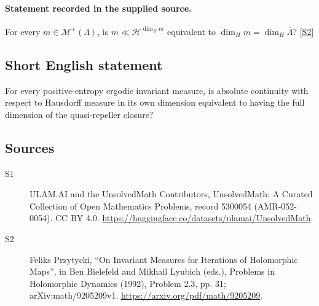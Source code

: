 \documentclass[11pt]{article}
\newcommand{\sref}[2]{\hyperlink{source:#1:#2}{[S#2]}}
\begin{document}
\paragraph{Statement recorded in the supplied source.}
For every $m\in\mathcal M^+(\Lambda)$, is $m\ll\mathcal H^{\dim_Hm}$ equivalent to $\dim_Hm=\dim_H\overline\Lambda$? \sref{5300054}{2}
\subsection{Short English statement}
For every positive-entropy ergodic invariant measure, is absolute continuity with respect to Hausdorff measure in its own dimension equivalent to having the full dimension of the quasi-repeller closure?
\subsection{Sources}
\begin{description}
\item[\hypertarget{source:5300054:1}{S1}] ULAM.AI and the UnsolvedMath Contributors, UnsolvedMath: A Curated Collection of Open Mathematics Problems, record 5300054 (AMR-052-0054). CC BY 4.0. \url{https://huggingface.co/datasets/ulamai/UnsolvedMath}.
\item[\hypertarget{source:5300054:2}{S2}] Feliks Przytycki, ``On Invariant Measures for Iterations of Holomorphic Maps'', in Ben Bielefeld and Mikhail Lyubich (eds.), Problems in Holomorphic Dynamics (1992), Problem 2.3, pp. 31; arXiv:math/9205209v1. \url{https://arxiv.org/pdf/math/9205209}.
\end{description}
\label{end:5300054}
\end{document}
